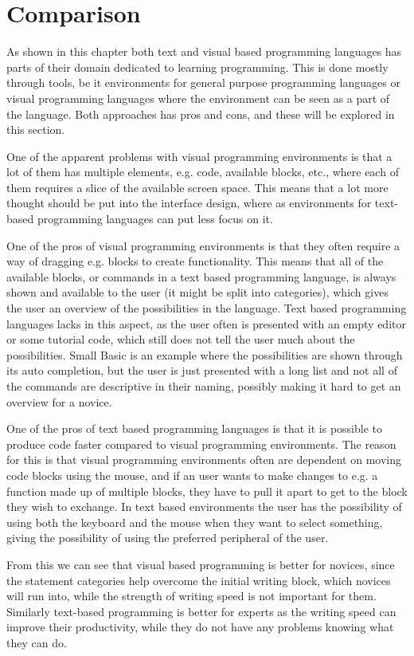 \section{Comparison}
\label{sec:comparison_text_visual}
As shown in this chapter both text and visual based programming languages has parts of their domain dedicated to learning programming. This is done mostly through tools, be it environments for general purpose programming languages or visual programming languages where the environment can be seen as a part of the language. Both approaches has pros and cons, and these will be explored in this section.

\begin{description}[style=nextline]
\item[Interface Layout] One of the apparent problems with visual programming environments is that a lot of them has multiple elements, e.g. code, available blocks, etc., where each of them requires a slice of the available screen space. This means that a lot more thought should be put into the interface design, where as environments for text-based programming languages can put less focus on it.
\item[Statement Categories] One of the pros of visual programming environments is that they often require a way of dragging e.g. blocks to create functionality. This means that all of the available blocks, or commands in a text based programming language, is always shown and available to the user (it might be split into categories), which gives the user an overview of the possibilities in the language. Text based programming languages lacks in this aspect, as the user often is presented with an empty editor or some tutorial code, which still does not tell the user much about the possibilities. Small Basic is an example where the possibilities are shown through its auto completion, but the user is just presented with a long list and not all of the commands are descriptive in their naming, possibly making it hard to get an overview for a novice.
\item[Writing Speed] One of the pros of text based programming languages is that it is possible to produce code faster compared to visual programming environments. The reason for this is that visual programming environments often are dependent on moving code blocks using the mouse, and if an user wants to make changes to e.g. a function made up of multiple blocks, they have to pull it apart to get to the block they wish to exchange. In text based environments the user has the possibility of using both the keyboard and the mouse when they want to select something, giving the possibility of using the preferred peripheral of the user.
\end{description}

From this we can see that visual based programming is better for novices, since the statement categories help overcome the initial writing block, which novices will run into, while the strength of writing speed is not important for them.
Similarly text-based programming is better for experts as the writing speed can improve their productivity, while they do not have any problems knowing what they can do.